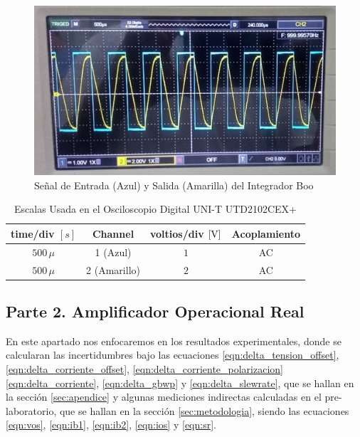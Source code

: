         \begin{figure}[H]
            \centering
            \renewcommand{\figurename}{Imagen}
            \includegraphics[width=15cm]{Imagenes/exp_integrador_boo.png}
            \caption{Señal de Entrada (Azul) y Salida (Amarilla) del Integrador Boo}
            \label{fig:exp_integrador_boo}
        \end{figure}
    
        \begin{table}[H]
            \centering
            \begin{tabular}{|c|c|c|c|}
                \hline
                \textbf{time/div} $[s]$ & \textbf{Channel} & \textbf{voltios/div $[\volt]$} & \textbf{Acoplamiento} \\ \hline
                $500 \, \mu$ & 1 (Azul) &  $1 $ & AC \\ \hline
                $500 \, \mu$ & 2 (Amarillo)  &   $2 $ & AC \\ \hline  
            \end{tabular}
            \caption{Escalas Usada en el Osciloscopio Digital UNI-T UTD2102CEX+}
            \label{tab:escala_exp_integrador_boo}
        \end{table}

        
\subsection{Parte 2. Amplificador Operacional Real}\label{subsec:parte2}

    En este apartado nos enfocaremos en los resultados experimentales, donde se calcularan las incertidumbres bajo las ecuaciones \ref{eqn:delta_tension_offset}, \ref{eqn:delta_corriente_offset}, \ref{eqn:delta_corriente_polarizacion}\ref{eqn:delta_corriente}, \ref{eqn:delta_gbwp} y \ref{eqn:delta_slewrate}, que se hallan en la sección \ref{sec:apendice} y algunas mediciones indirectas calculadas en el pre-laboratorio, que se hallan en la sección \ref{sec:metodologia}, siendo las ecuaciones \ref{eqn:vos}, \ref{eqn:ib1}, \ref{eqn:ib2}, \ref{eqn:ios} y \ref{eqn:sr}.

